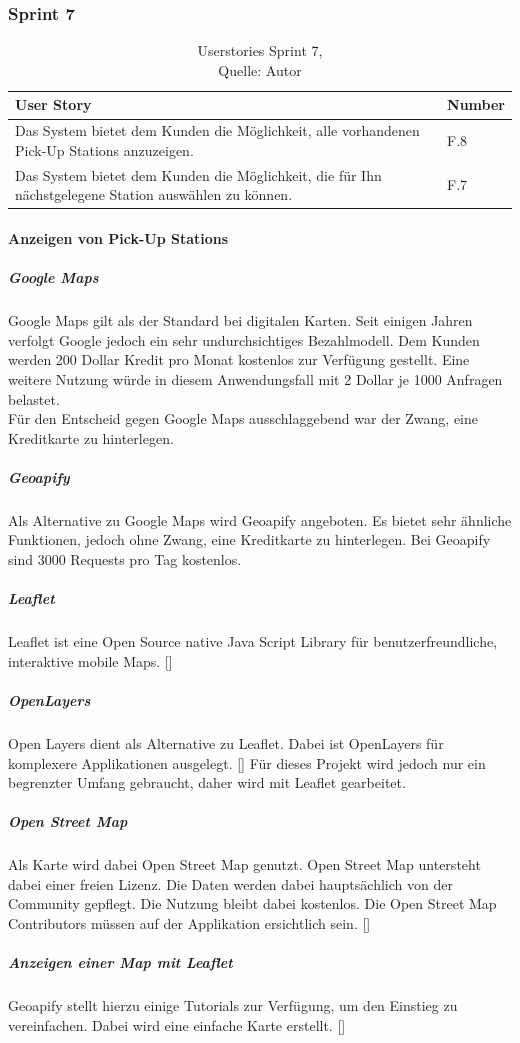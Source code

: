 \subsubsection{Sprint 7}
\begin{table}[H]
	\setlength\extrarowheight{2pt} %
	\begin{tabularx}{\textwidth}{|X|l|}
		\hline
		\textbf{User Story} & \textbf{Number} \\
		\hline
		Das System bietet dem Kunden die Möglichkeit, alle vorhandenen Pick-Up Stations anzuzeigen. & F.8\\
		\hline
		Das System bietet dem Kunden die Möglichkeit, die für Ihn nächstgelegene Station auswählen zu können. & F.7\\
		\hline
	\end{tabularx} 
	\caption[Userstories Sprint 7]{Userstories Sprint 7,\\ Quelle: Autor}
\end{table}\label{userStoriesSprint7}
\paragraph{Anzeigen von Pick-Up Stations}
\subparagraph{Google Maps}
Google Maps gilt als der Standard bei digitalen Karten. Seit einigen Jahren verfolgt Google jedoch ein sehr undurchsichtiges Bezahlmodell. Dem Kunden werden 200 Dollar Kredit pro Monat kostenlos zur Verfügung gestellt. Eine weitere Nutzung würde in diesem Anwendungsfall mit 2 Dollar je 1000 Anfragen belastet. \\
Für den Entscheid gegen Google Maps ausschlaggebend war der Zwang, eine Kreditkarte zu hinterlegen. 
\subparagraph{Geoapify}
Als Alternative zu Google Maps wird Geoapify angeboten. Es bietet sehr ähnliche Funktionen, jedoch ohne Zwang, eine Kreditkarte zu hinterlegen. Bei Geoapify sind 3000 Requests pro Tag kostenlos. 
\subparagraph{Leaflet}
Leaflet ist eine Open Source native Java Script Library für benutzerfreundliche, interaktive mobile Maps. [\cite{leaflet}]
\subparagraph{OpenLayers}
Open Layers dient als Alternative zu Leaflet. Dabei ist OpenLayers für komplexere Applikationen ausgelegt. [\cite{leafletVsOpenlayers}]
Für dieses Projekt wird jedoch nur ein begrenzter Umfang gebraucht, daher wird mit Leaflet gearbeitet. 

\subparagraph{Open Street Map}
Als Karte wird dabei Open Street Map genutzt. Open Street Map untersteht dabei einer freien Lizenz. Die Daten werden dabei hauptsächlich von der Community gepflegt. Die Nutzung bleibt dabei kostenlos. Die Open Street Map Contributors müssen auf der Applikation ersichtlich sein.  [\cite{openStreetMap}]
\subparagraph{Anzeigen einer Map mit Leaflet}
Geoapify stellt hierzu einige Tutorials zur Verfügung, um den Einstieg zu vereinfachen. Dabei wird eine einfache Karte erstellt. [\cite{geoapifyLeaflet}]


